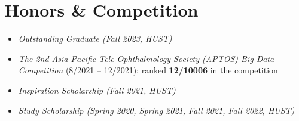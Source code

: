 \section{Honors \& Competition}

 \begin{itemize}[leftmargin=0.35in]
    \item \textit{Outstanding Graduate (Fall 2023, HUST)}
    \item \textit{The 2nd Asia Pacific Tele-Ophthalmology Society (APTOS) Big Data Competition} (8/2021 – 12/2021): ranked \textbf{12/10006} in the competition 
    \item \textit{Inspiration Scholarship (Fall 2021, HUST)}
    \item \textit{Study Scholarship (Spring 2020, Spring 2021, Fall 2021, Fall 2022, HUST)}

      
 \end{itemize}
